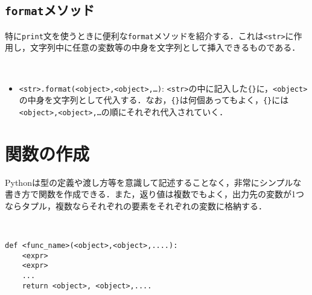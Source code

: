 \begin{cod}[\texttt{py3.py}]　
}]{code/py3.py}
\vspace{-7pt}
\begin{lstlisting}
<class 'str'>
<class 'type'>
\end{lstlisting}
\end{cod}
\vspace{-10pt}

\subsection{\texttt{format}メソッド}

特に\texttt{print}文を使うときに便利な\texttt{format}メソッドを紹介する．これは\texttt{<str>}に作用し，文字列中に任意の変数等の中身を文字列として挿入できるものである．

\begin{gram}　
\begin{itemize}
\item \texttt{<str>.format(<object>,<object>,\ldots)}: \texttt{<str>}の中に記入した\texttt{\{\}}に，\texttt{<object>}の中身を文字列として代入する．なお，\texttt{\{\}}は何個あってもよく，\texttt{\{\}}には\texttt{<object>,<object>,\ldots}の順にそれぞれ代入されていく．
\end{itemize}
\end{gram}

\begin{cod}[\texttt{py4.py}]　
}]{code/py4.py}
\vspace{-7pt}
\begin{lstlisting}
p={'x': 3, 'y': 5}, type=<class 'dict'>
\end{lstlisting}
\end{cod}
\vspace{-10pt}


\section{関数の作成}
Pythonは型の定義や渡し方等を意識して記述することなく，非常にシンプルな書き方で関数を作成できる．また，返り値は複数でもよく，出力先の変数が1つならタプル，複数ならそれぞれの要素をそれぞれの変数に格納する．

\begin{gram}　
\begin{lstlisting}
def <func_name>(<object>,<object>,....):
	<expr>
	<expr>
	...
	return <object>, <object>,....
\end{lstlisting}
\end{gram}

\begin{cod}[\texttt{py5.py}]　
}]{code/py5.py}
\vspace{-7pt}
\begin{lstlisting}
add=9,sub=11,mul=-10,div=-10.0
tpl=(0, 10, -25, -1.0)
\end{lstlisting}
\end{cod}
\vspace{-10pt}

















